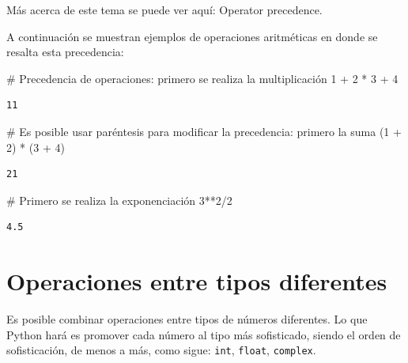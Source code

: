 \documentclass[
  spanish,
  letterpaper,
]{scrbook}
\newenvironment{Shaded}{\begin{snugshade}}{\end{snugshade}}
\newcommand{\CommentTok}[1]{\textcolor[rgb]{0.37,0.37,0.37}{#1}}
\newcommand{\DecValTok}[1]{\textcolor[rgb]{0.68,0.00,0.00}{#1}}
\newcommand{\NormalTok}[1]{\textcolor[rgb]{0.00,0.23,0.31}{#1}}
\newcommand{\OperatorTok}[1]{\textcolor[rgb]{0.37,0.37,0.37}{#1}}
\theoremstyle{definition}
\theoremstyle{remark}
\begin{document}
Más acerca de este tema se puede ver aquí: Operator precedence.

A continuación se muestran ejemplos de operaciones aritméticas en donde
se resalta esta precedencia:

\begin{Shaded}
\begin{Highlighting}[]
\CommentTok{\# Precedencia de operaciones: primero se realiza la multiplicación}
\DecValTok{1} \OperatorTok{+} \DecValTok{2} \OperatorTok{*} \DecValTok{3} \OperatorTok{+} \DecValTok{4}
\end{Highlighting}
\end{Shaded}

\begin{verbatim}
11
\end{verbatim}

\begin{Shaded}
\begin{Highlighting}[]
\CommentTok{\# Es posible usar paréntesis para modificar la precedencia: primero la suma}
\NormalTok{(}\DecValTok{1} \OperatorTok{+} \DecValTok{2}\NormalTok{) }\OperatorTok{*}\NormalTok{ (}\DecValTok{3} \OperatorTok{+} \DecValTok{4}\NormalTok{)}
\end{Highlighting}
\end{Shaded}

\begin{verbatim}
21
\end{verbatim}

\begin{Shaded}
\begin{Highlighting}[]
\CommentTok{\# Primero se realiza la exponenciación}
\DecValTok{3}\OperatorTok{**}\DecValTok{2}\OperatorTok{/}\DecValTok{2}
\end{Highlighting}
\end{Shaded}

\begin{verbatim}
4.5
\end{verbatim}

\section{Operaciones entre tipos
diferentes}\label{operaciones-entre-tipos-diferentes}

Es posible combinar operaciones entre tipos de números diferentes. Lo
que Python hará es promover cada número al tipo más sofisticado, siendo
el orden de sofisticación, de menos a más, como sigue: \texttt{int},
\texttt{float}, \texttt{complex}.
\end{document}

